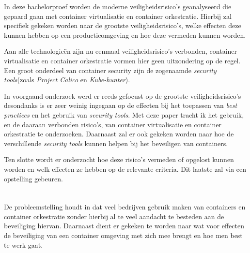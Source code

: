 In deze bachelorproef worden de moderne veiligheidsrisico’s geanalyseerd die gepaard gaan met container virtualisatie en container orkestratie. Hierbij zal specifiek gekeken worden naar de grootste veiligheidsrisico’s, welke effecten deze kunnen hebben op een productieomgeving en hoe deze vermeden kunnen worden.

Aan alle technologieën zijn nu eenmaal veiligheidsrisico’s verbonden, container virtualisatie en container orkestratie vormen hier geen uitzondering op de regel. Een groot onderdeel van container security zijn de zogenaamde \textit{security tools}(zoals \textit{Project Calico} en \textit{Kube-hunter}).

In voorgaand onderzoek werd er reeds gefocust op de grootste veiligheidsrisico’s desondanks is er zeer weinig ingegaan op de effecten bij het toepassen van \textit{best practices} en het gebruik van  \textit{security tools}. Met deze paper tracht ik het gebruik, en de daaraan verbonden risico’s, van container virtualisatie en container orkestratie te onderzoeken. Daarnaast zal er ook gekeken worden naar hoe de verschillende \textit{security tools} kunnen helpen bij het beveiligen van containers.

Ten slotte wordt er onderzocht hoe deze risico’s vermeden of opgelost kunnen worden en welk effecten ze hebben op de relevante criteria. Dit laatste zal via een  opstelling gebeuren.

\section{}
\label{sec:probleemstelling}

De probleemstelling houdt in dat veel bedrijven gebruik maken van containers en container orkestratie zonder hierbij al te veel aandacht te besteden aan de beveiliging hiervan. Daarnaast dient er gekeken te worden naar wat voor effecten de beveiliging van een container omgeving met zich mee brengt en hoe men best te werk gaat.

